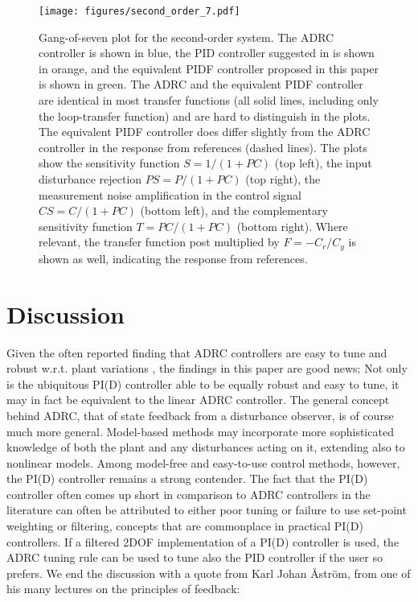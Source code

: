 \documentclass[letterpaper, 10 pt, conference]{ieeeconf}
\begin{document}
\begin{figure*}%
	\centering
	\texttt{[image: figures/second\_order\_7.pdf]}
	\caption{Gang-of-seven plot for the second-order system. The ADRC controller is shown in blue, the PID controller suggested in \cite{herbst2013simulative} is shown in orange, and the equivalent PIDF controller proposed in this paper is shown in green. The ADRC and the equivalent PIDF controller are identical in most transfer functions (all solid lines, including only the loop-transfer function) and are hard to distinguish in the plots. The equivalent PIDF controller does differ slightly from the ADRC controller in the response from references (dashed lines). The plots show the sensitivity function $S = 1/(1+PC)$ (top left), the input disturbance rejection $PS = P/(1+PC)$ (top right), the measurement noise amplification in the control signal $CS = C/(1+PC)$ (bottom left), and the complementary sensitivity function $T = PC/(1+PC)$ (bottom right). Where relevant, the transfer function post multiplied by $F = -C_r / C_y$ is shown as well, indicating the response from references.}
	\label{fig:second_order_7}
\end{figure*}


\section{Discussion}
Given the often reported finding that ADRC controllers are easy to tune and robust w.r.t. plant variations \cite{herbst2013simulative}, the findings in this paper are good news; Not only is the ubiquitous PI(D) controller able to be equally robust and easy to tune, it may in fact be equivalent to the linear ADRC controller. The general concept behind ADRC, that of state feedback from a disturbance observer, is of course much more general. Model-based methods may incorporate more sophisticated knowledge of both the plant and any disturbances acting on it, extending also to nonlinear models. Among model-free and easy-to-use control methods, however, the PI(D) controller remains a strong contender. The fact that the PI(D) controller often comes up short in comparison to ADRC controllers in the literature can often be attributed to either poor tuning or failure to use set-point weighting or filtering, concepts that are commonplace in practical PI(D) controllers. If a filtered 2DOF implementation of a PI(D) controller is used, the ADRC tuning rule can be used to tune also the PID controller if the user so prefers. We end the discussion with a quote from Karl Johan Åström, from one of his many lectures on the principles of feedback:
\end{document}
